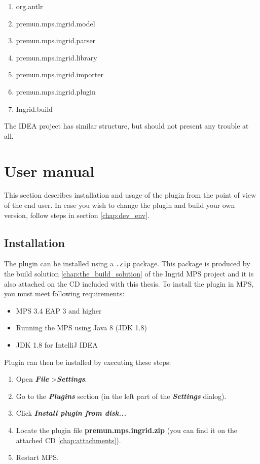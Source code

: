 \begin{enumerate}
	\item org.antlr
	\item premun.mps.ingrid.model
	\item premun.mps.ingrid.parser
	\item premun.mps.ingrid.library
	\item premun.mps.ingrid.importer
	\item premun.mps.ingrid.plugin
	\item Ingrid.build
\end{enumerate}

The IDEA project has similar structure, but should not present any trouble at all.

\section{User manual}

This section describes installation and usage of the plugin from the point of view of the end user.
In case you wish to change the plugin and build your own version, follow steps in section \ref{chap:dev_env}.

\subsection{Installation}

The plugin can be installed using a \texttt{.zip} package.
This package is produced by the build solution \ref{chap:the_build_solution} of the Ingrid MPS project and it is also attached on the CD included with this thesis.
To install the plugin in MPS, you must meet following requirements:

\begin{itemize}
	\item MPS 3.4 EAP 3 and higher
	\item Running the MPS using Java 8 (JDK 1.8)
	\item JDK 1.8 for IntelliJ IDEA
\end{itemize}

\noindent
Plugin can then be installed by executing these steps:

\begin{enumerate}
	\item Open \textbf{\textit{File}} \textgreater \textbf{\textit{Settings}}.
	\item Go to the \textbf{\textit{Plugins}} section (in the left part of the \textbf{\textit{Settings}} dialog).
	\item Click \textbf{\textit{Install plugin from disk...}}
	\item Locate the plugin file \textbf{premun.mps.ingrid.zip} (you can find it on the attached CD \ref{chap:attachments}).
	\item Restart MPS.
\end{enumerate}

